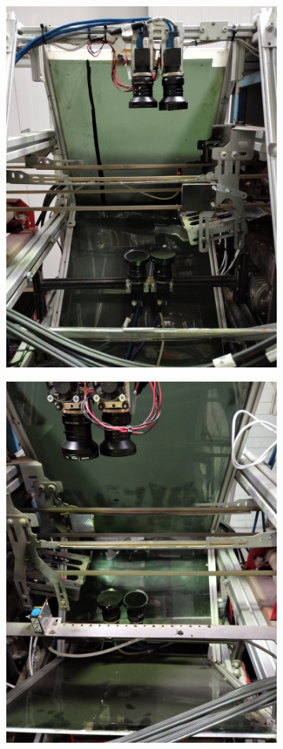 \documentclass[fleqn,twoside,12pt]{report}
\begin{document}
\begin{figure}[h]
	\centering
	\begin{subfigure}{.25\textwidth}
		\centering
		\includegraphics[width=0.9\linewidth]{clean_1.jpg}
		\caption{}
		\label{fig:clean_1}
	\end{subfigure}%
	\begin{subfigure}{.25\textwidth}
		\centering
		\includegraphics[width=0.9\linewidth]{clean_2.jpg}

\end{subfigure}
\end{figure}
\end{document}
